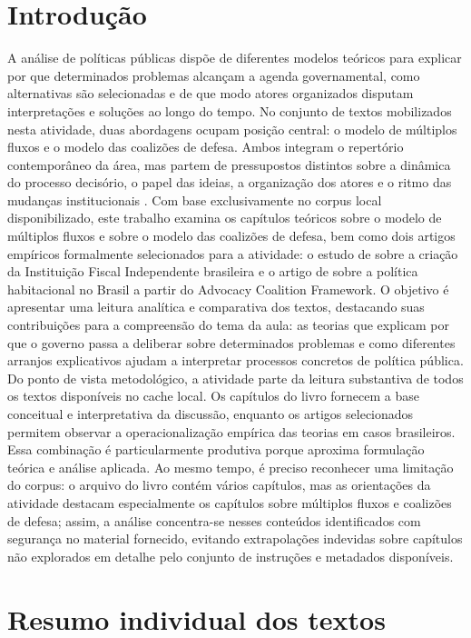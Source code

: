\documentclass[12pt,a4paper]{article}
\begin{document}
\section{Introdução}
\label{sec:org6f56491}
A análise de políticas públicas dispõe de diferentes modelos teóricos para explicar por que determinados problemas alcançam a agenda governamental, como alternativas são selecionadas e de que modo atores organizados disputam interpretações e soluções ao longo do tempo. No conjunto de textos mobilizados nesta atividade, duas abordagens ocupam posição central: o modelo de múltiplos fluxos e o modelo das coalizões de defesa. Ambos integram o repertório contemporâneo da área, mas partem de pressupostos distintos sobre a dinâmica do processo decisório, o papel das ideias, a organização dos atores e o ritmo das mudanças institucionais \autocites{capella2022multiplos}{araujoSilva2022coalizoes}.
Com base exclusivamente no corpus local disponibilizado, este trabalho examina os capítulos teóricos sobre o modelo de múltiplos fluxos e sobre o modelo das coalizões de defesa, bem como dois artigos empíricos formalmente selecionados para a atividade: o estudo de \textcite{bijos2024ifi} sobre a criação da Instituição Fiscal Independente brasileira e o artigo de \textcite{ferreira2019habitacional} sobre a política habitacional no Brasil a partir do Advocacy Coalition Framework. O objetivo é apresentar uma leitura analítica e comparativa dos textos, destacando suas contribuições para a compreensão do tema da aula: as teorias que explicam por que o governo passa a deliberar sobre determinados problemas e como diferentes arranjos explicativos ajudam a interpretar processos concretos de política pública.
Do ponto de vista metodológico, a atividade parte da leitura substantiva de todos os textos disponíveis no cache local. Os capítulos do livro fornecem a base conceitual e interpretativa da discussão, enquanto os artigos selecionados permitem observar a operacionalização empírica das teorias em casos brasileiros. Essa combinação é particularmente produtiva porque aproxima formulação teórica e análise aplicada. Ao mesmo tempo, é preciso reconhecer uma limitação do corpus: o arquivo do livro contém vários capítulos, mas as orientações da atividade destacam especialmente os capítulos sobre múltiplos fluxos e coalizões de defesa; assim, a análise concentra-se nesses conteúdos identificados com segurança no material fornecido, evitando extrapolações indevidas sobre capítulos não explorados em detalhe pelo conjunto de instruções e metadados disponíveis.
\section{Resumo individual dos textos}
\label{sec:org1407e4d}
\end{document}
